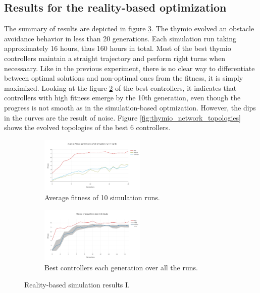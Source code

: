 \subsection{Results for the reality-based optimization}

The summary of results are depicted in figure \ref{fig:real_based_resultsI}. The thymio evolved an obstacle avoidance behavior in less than 20 generations. Each simulation run taking  approximately 16 hours, thus 160 hours in total. Most of the best thymio controllers maintain a straight trajectory and perform right turns when necessaary. Like in the previous experiment, there is no clear way to differentiate between optimal solutions and non-optimal ones from the fitness, it is simply maximized. Looking at the figure \ref{fig:real_best_genomes_percentile} of the best controllers, it indicates that controllers with high fitness emerge by the 10th generation, even though the progress is not smooth as in the simulation-based optmization. However, the dips in the curves are the result of noise. Figure \ref{fig:thymio_network_topologies} shows the evolved topologies of the best 6 controllers.

\begin{figure}[H]
    \centering
    \begin{subfigure}[b]{0.8\textwidth}
    	\centering
        \includegraphics[width=5cm]{include/images/real_avg_fitness.PNG}
        \caption{Average fitness of 10 simulation runs.}
        \label{fig:real_avg_fitness}
    \end{subfigure}
    \begin{subfigure}[b]{0.8\textwidth}
    	\centering
        \includegraphics[width=5cm]{include/images/real_best_genomes_percentile.PNG}
        \caption{Best controllers each generation over all the runs.}
        \label{fig:real_best_genomes_percentile}
    \end{subfigure}
    \caption{Reality-based simulation results I.}
	\label{fig:real_based_resultsI}
\end{figure}

